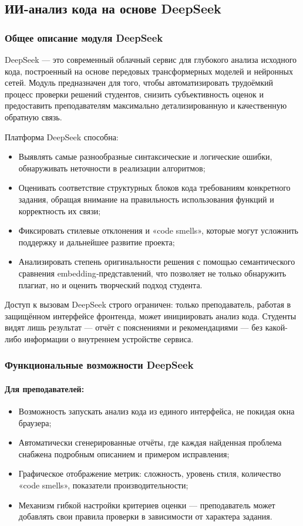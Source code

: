 \subsection{ИИ-анализ кода на основе DeepSeek}

\subsubsection{Общее описание модуля DeepSeek}
DeepSeek — это современный облачный сервис для глубокого анализа исходного кода, построенный на основе передовых трансформерных моделей и нейронных сетей\cite{deepseek_docs}. Модуль предназначен для того, чтобы автоматизировать трудоёмкий процесс проверки решений студентов, снизить субъективность оценок и предоставить преподавателям максимально детализированную и качественную обратную связь.

Платформа DeepSeek способна:
\begin{itemize}
  \item Выявлять самые разнообразные синтаксические и логические ошибки, обнаруживать неточности в реализации алгоритмов;
  \item Оценивать соответствие структурных блоков кода требованиям конкретного задания, обращая внимание на правильность использования функций и корректность их связи;
  \item Фиксировать стилевые отклонения и «code smells», которые могут усложнить поддержку и дальнейшее развитие проекта;
  \item Анализировать степень оригинальности решения с помощью семантического сравнения embedding‐представлений, что позволяет не только обнаружить плагиат, но и оценить творческий подход студента.
\end{itemize}

Доступ к вызовам DeepSeek строго ограничен: только преподаватель, работая в защищённом интерфейсе фронтенда, может инициировать анализ кода. Студенты видят лишь результат — отчёт с пояснениями и рекомендациями — без какой-либо информации о внутреннем устройстве сервиса.

\subsubsection{Функциональные возможности DeepSeek}

\paragraph{Для преподавателей:}
\begin{itemize}
  \item Возможность запускать анализ кода из единого интерфейса, не покидая окна браузера;
  \item Автоматически сгенерированные отчёты, где каждая найденная проблема снабжена подробным описанием и примером исправления;
  \item Графическое отображение метрик: сложность, уровень стиля, количество «code smells», показатели производительности;
  \item Механизм гибкой настройки критериев оценки — преподаватель может добавлять свои правила проверки в зависимости от характера задания.
\end{itemize}

